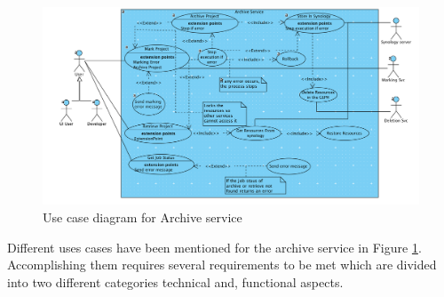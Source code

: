  \begin{figure}[H]
    \centering \includegraphics[scale=0.6, angle=90, origin=c]{grafiken/archiveUseCase.png}
    \caption{Use case diagram for Archive service}
    \label{fig:archiveUseCase}
\end{figure}
 
Different uses cases have been mentioned for the archive service in Figure \ref{fig:archiveUseCase}. Accomplishing them requires several requirements to be met
which are divided into two different categories technical and, functional aspects. 


